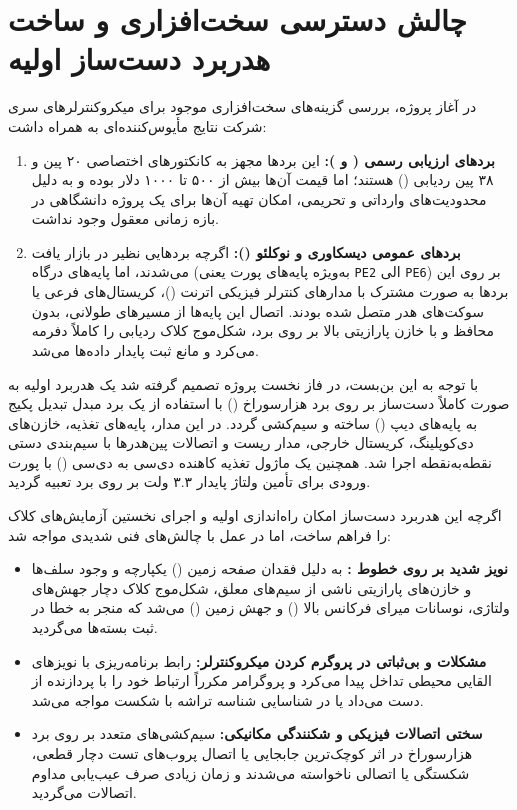 \section{چالش دسترسی سخت‌افزاری و ساخت هدربرد دست‌ساز اولیه}
\label{sec:hw_board_challenge}
در آغاز پروژه، بررسی گزینه‌های سخت‌افزاری موجود برای میکروکنترلرهای سری  شرکت  نتایج مأیوس‌کننده‌ای به همراه داشت:
\begin{enumerate}
    \item \textbf{بردهای ارزیابی رسمی ( و ):} این بردها مجهز به کانکتورهای اختصاصی ۲۰ پین و ۳۸ پین ردیابی () هستند؛ اما قیمت آن‌ها بیش از ۵۰۰ تا ۱۰۰۰ دلار بوده و به دلیل محدودیت‌های وارداتی و تحریمی، امکان تهیه آن‌ها برای یک پروژه دانشگاهی در بازه زمانی معقول وجود نداشت.
    \item \textbf{بردهای عمومی دیسکاوری و نوکلئو ():} اگرچه بردهایی نظیر  در بازار یافت می‌شدند، اما پایه‌های درگاه  (به‌ویژه پایه‌های پورت  یعنی \texttt{PE2} الی \texttt{PE6}) بر روی این بردها به صورت مشترک با مدارهای کنترلر فیزیکی اترنت ()، کریستال‌های فرعی یا سوکت‌های هدر  متصل شده بودند. اتصال این پایه‌ها از مسیرهای طولانی، بدون محافظ و با خازن پارازیتی بالا بر روی برد، شکل‌موج کلاک ردیابی را کاملاً دفرمه می‌کرد و مانع ثبت پایدار داده‌ها می‌شد.
\end{enumerate}

با توجه به این بن‌بست، در فاز نخست پروژه تصمیم گرفته شد یک هدربرد اولیه به صورت کاملاً دست‌ساز بر روی برد هزارسوراخ () با استفاده از یک برد مبدل تبدیل پکیج  به پایه‌های دیپ () ساخته و سیم‌کشی گردد. در این مدار، پایه‌های تغذیه، خازن‌های دی‌کوپلینگ، کریستال خارجی، مدار ریست و اتصالات پین‌هدرها با سیم‌بندی دستی نقطه‌به‌نقطه اجرا شد. همچنین یک ماژول تغذیه کاهنده دی‌سی به دی‌سی () با پورت ورودی  برای تأمین ولتاژ پایدار ۳.۳ ولت بر روی برد تعبیه گردید.

اگرچه این هدربرد دست‌ساز امکان راه‌اندازی اولیه و اجرای نخستین آزمایش‌های کلاک را فراهم ساخت، اما در عمل با چالش‌های فنی شدیدی مواجه شد:
\begin{itemize}
    \item \textbf{نویز شدید بر روی خطوط :} به دلیل فقدان صفحه زمین () یکپارچه و وجود سلف‌ها و خازن‌های پارازیتی ناشی از سیم‌های معلق، شکل‌موج کلاک  دچار جهش‌های ولتاژی، نوسانات میرای فرکانس بالا () و جهش زمین () می‌شد که منجر به خطا در ثبت بسته‌ها می‌گردید.
    \item \textbf{مشکلات و بی‌ثباتی در پروگرم کردن میکروکنترلر:} رابط برنامه‌ریزی  با نویزهای القایی محیطی تداخل پیدا می‌کرد و پروگرامر  مکرراً ارتباط خود را با پردازنده از دست می‌داد یا در شناسایی شناسه تراشه با شکست مواجه می‌شد.
    \item \textbf{سختی اتصالات فیزیکی و شکنندگی مکانیکی:} سیم‌کشی‌های متعدد بر روی برد هزارسوراخ در اثر کوچک‌ترین جابجایی یا اتصال پروب‌های تست دچار قطعی، شکستگی یا اتصالی ناخواسته می‌شدند و زمان زیادی صرف عیب‌یابی مداوم اتصالات می‌گردید.
\end{itemize}

